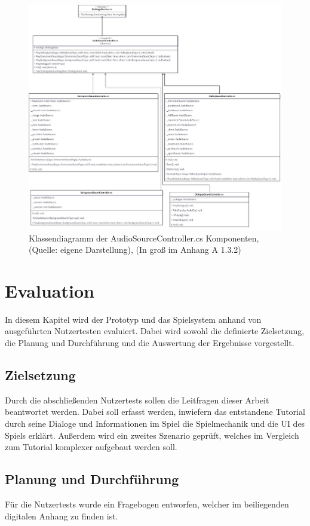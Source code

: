 \begin{figure}[ht]
\centering
\includegraphics[width=1\linewidth]{content/pictures/AudioSourceController.jpg}
\caption{Klassendiagramm der AudioSourceController.cs Komponenten, (Quelle: eigene Darstellung), (In groß im Anhang A 1.3.2)}
\label{fig:audio-source-controller}
\end{figure}

\chapter{Evaluation}\label{sec:test}
In diesem Kapitel wird der Prototyp und das Spielsystem anhand von ausgeführten Nutzertesten evaluiert. Dabei wird sowohl die definierte Zielsetzung, die Planung und Durchführung und die Auswertung der Ergebnisse vorgestellt.

\section{Zielsetzung}
Durch die abschließenden Nutzertests sollen die Leitfragen dieser Arbeit beantwortet werden. Dabei soll erfasst werden, inwiefern das entstandene Tutorial durch seine Dialoge und Informationen im Spiel die Spielmechanik und die \ac{UI} des Spiels erklärt. Außerdem wird ein zweites Szenario geprüft, welches im Vergleich zum Tutorial komplexer aufgebaut werden soll. 

\section{Planung und Durchführung}
Für die Nutzertests wurde ein Fragebogen entworfen, welcher im beiliegenden digitalen Anhang zu finden ist. 

